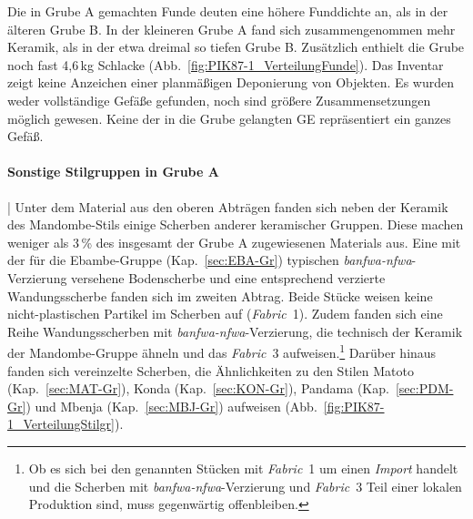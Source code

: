 Die in Grube A gemachten Funde deuten eine höhere Funddichte an, als in der älteren Grube B. In der kleineren Grube A fand sich zusammengenommen mehr Keramik, als in der etwa dreimal so tiefen Grube B. Zusätzlich enthielt die Grube noch fast 4,6\,kg Schlacke (Abb.~\ref{fig:PIK87-1_VerteilungFunde}). Das Inventar zeigt keine Anzeichen einer planmäßigen Deponierung von Objekten. Es wurden weder vollständige Gefäße gefunden, noch sind größere Zusammensetzungen möglich gewesen. Keine der in die Grube gelangten GE repräsentiert ein ganzes Gefäß.

\paragraph{Sonstige Stilgruppen in Grube A}\hspace{-.5em}|\hspace{.5em}%
Unter dem Material aus den oberen Abträgen fanden sich neben der Keramik des Mandombe-Stils einige Scherben anderer keramischer Gruppen. Diese machen weniger als 3\,\% des insgesamt der Grube A zugewiesenen Materials aus. Eine mit der für die Ebambe-Gruppe (Kap.~\ref{sec:EBA-Gr}) typischen \textit{banfwa-nfwa}-Verzierung versehene Bodenscherbe und eine entsprechend verzierte Wandungsscherbe fanden sich im zweiten Abtrag. Beide Stücke weisen keine nicht-plastischen Partikel im Scherben auf (\textit{Fabric}~1). Zudem fanden sich eine Reihe Wandungsscherben mit \textit{banfwa-nfwa}-Verzierung, die technisch der Keramik der Mandombe-Gruppe ähneln und das \textit{Fabric}~3 aufweisen.\footnote{Ob es sich bei den genannten Stücken mit \textit{Fabric}~1 um einen \textit{Import} handelt und die Scherben mit \textit{banfwa-nfwa}-Verzierung und \textit{Fabric}~3 Teil einer lokalen Produktion sind, muss gegenwärtig offenbleiben.} Darüber hinaus fanden sich vereinzelte Scherben, die Ähnlichkeiten zu den Stilen Matoto (Kap.~\ref{sec:MAT-Gr}), Konda (Kap.~\ref{sec:KON-Gr}), Pandama (Kap.~\ref{sec:PDM-Gr}) und Mbenja (Kap.~\ref{sec:MBJ-Gr}) aufweisen (Abb.~\ref{fig:PIK87-1_VerteilungStilgr}). 

